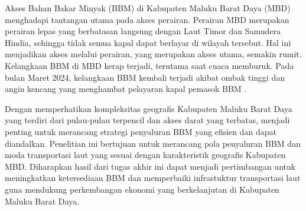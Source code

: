     Akses Bahan Bakar Minyak (BBM) di Kabupaten Maluku Barat Daya (MBD) menghadapi tantangan utama pada akses perairan. Perairan MBD merupakan perairan lepas yang berbatasan langsung dengan Laut Timor dan Samudera Hindia, sehingga tidak semua kapal dapat berlayar di wilayah tersebut. Hal ini menjadikan akses melalui perairan, yang merupakan akses utama, semakin rumit. Kelangkaan BBM di MBD kerap terjadi, terutama saat cuaca memburuk. Pada bulan Maret 2024, kelangkaan BBM kembali terjadi akibat ombak tinggi dan angin kencang yang menghambat pelayaran kapal pemasok BBM \citep{RRI_2024}.

    Dengan memperhatikan kompleksitas geografis Kabupaten Maluku Barat Daya yang terdiri dari pulau-pulau terpencil dan akses darat yang terbatas, menjadi penting untuk merancang strategi penyaluran BBM yang efisien dan dapat diandalkan. Penelitian ini bertujuan untuk merancang pola penyaluran BBM dan moda transportasi laut yang sesuai dengan karakteristik geografis Kabupaten MBD. Diharapkan hasil dari tugas akhir ini dapat menjadi pertimbangan untuk meningkatkan ketersediaan BBM dan memperbaiki infrastuktur transportasi laut guna mendukung perkembangan ekonomi yang berkelanjutan di Kabupaten Maluku Barat Daya.

